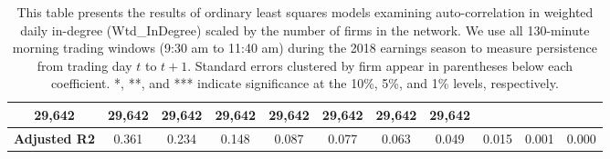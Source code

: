 \begin{table}
{\begin{tabular}{ccccccccccc}
  \multicolumn{1}{c|}{29,642} &
  \multicolumn{1}{c|}{29,642} &
  \multicolumn{1}{c|}{29,642} &
  \multicolumn{1}{c|}{29,642} &
  \multicolumn{1}{c|}{29,642} &
  \multicolumn{1}{c|}{29,642} &
  \multicolumn{1}{c|}{29,642} &
  \multicolumn{1}{c|}{29,642} \\ \hline
\multicolumn{1}{|c|}{\textbf{Adjusted R2}} &
  \multicolumn{1}{c|}{0.361} &
  \multicolumn{1}{c|}{0.234} &
  \multicolumn{1}{c|}{0.148} &
  \multicolumn{1}{c|}{0.087} &
  \multicolumn{1}{c|}{0.077} &
  \multicolumn{1}{c|}{0.063} &
  \multicolumn{1}{c|}{0.049} &
  \multicolumn{1}{c|}{0.015} &
  \multicolumn{1}{c|}{0.001} &
  \multicolumn{1}{c|}{0.000} \\ \hline
\end{tabular}}
\caption{This table presents the results of ordinary least squares models examining auto-correlation in  weighted daily in-degree (Wtd\_InDegree) scaled by the number of firms in the network.  We use all 130-minute morning trading windows (9:30 am to 11:40 am) during the 2018 earnings season to measure persistence from trading day \(t\) to \(t+1\).   Standard errors clustered by firm appear in parentheses below each coefficient. *, **, and *** indicate significance at the 10\%,  5\%, and 1\% levels, respectively. }
\label{tab:TEAutoCorrIn}
\end{table}

